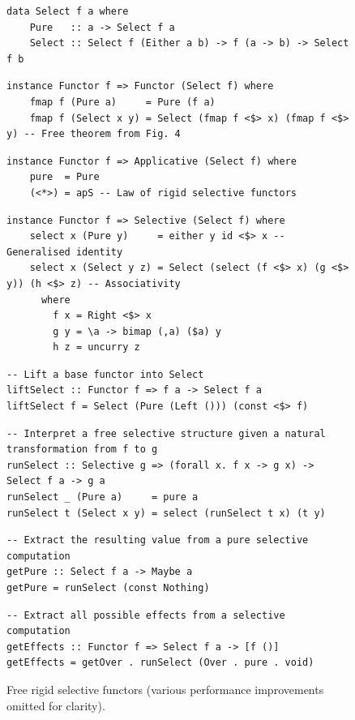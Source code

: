 \begin{figure}
\begin{verbatim}
data Select f a where
    Pure   :: a -> Select f a
    Select :: Select f (Either a b) -> f (a -> b) -> Select f b
\end{verbatim}
\vspace{0mm}
\begin{verbatim}
instance Functor f => Functor (Select f) where
    fmap f (Pure a)     = Pure (f a)
    fmap f (Select x y) = Select (fmap f <$> x) (fmap f <$> y) -- Free theorem from Fig. 4
\end{verbatim}
\vspace{0mm}
\begin{verbatim}
instance Functor f => Applicative (Select f) where
    pure  = Pure
    (<*>) = apS -- Law of rigid selective functors
\end{verbatim}
\vspace{0mm}
\begin{verbatim}
instance Functor f => Selective (Select f) where
    select x (Pure y)     = either y id <$> x -- Generalised identity
    select x (Select y z) = Select (select (f <$> x) (g <$> y)) (h <$> z) -- Associativity
      where
        f x = Right <$> x
        g y = \a -> bimap (,a) ($a) y
        h z = uncurry z
\end{verbatim}
\vspace{0mm}
\begin{verbatim}
-- Lift a base functor into Select
liftSelect :: Functor f => f a -> Select f a
liftSelect f = Select (Pure (Left ())) (const <$> f)
\end{verbatim}
\vspace{0mm}
\begin{verbatim}
-- Interpret a free selective structure given a natural transformation from f to g
runSelect :: Selective g => (forall x. f x -> g x) -> Select f a -> g a
runSelect _ (Pure a)     = pure a
runSelect t (Select x y) = select (runSelect t x) (t y)
\end{verbatim}
\vspace{0mm}
\begin{verbatim}
-- Extract the resulting value from a pure selective computation
getPure :: Select f a -> Maybe a
getPure = runSelect (const Nothing)
\end{verbatim}
\vspace{0mm}
\begin{verbatim}
-- Extract all possible effects from a selective computation
getEffects :: Functor f => Select f a -> [f ()]
getEffects = getOver . runSelect (Over . pure . void)
\end{verbatim}
\vspace{-1mm}
\caption{Free rigid selective functors (various performance improvements
omitted for clarity).}\label{fig-free}
\vspace{-3mm}
\end{figure}

